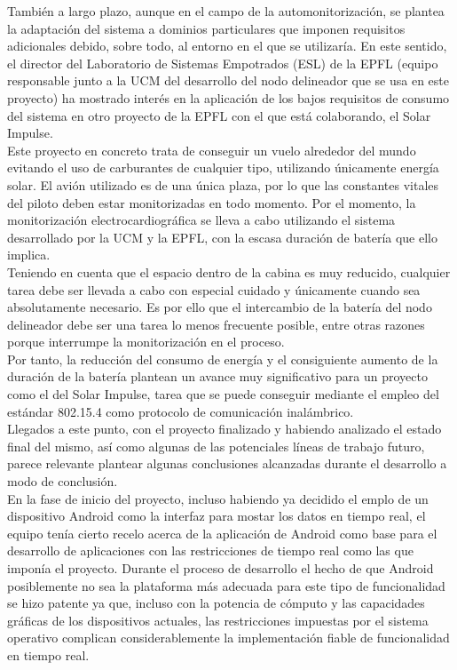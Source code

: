 	También a largo plazo, aunque en el campo de la automonitorización, se plantea la adaptación del
	sistema a dominios particulares que imponen requisitos adicionales debido, sobre todo, al entorno
	en el que se utilizaría. En este sentido, el director del Laboratorio de Sistemas Empotrados (ESL)
	de la EPFL (equipo responsable junto a la UCM del desarrollo del nodo delineador que se usa en
	este proyecto) ha mostrado interés en la aplicación de los bajos requisitos de consumo del sistema
	en otro proyecto de la EPFL con el que está colaborando, el Solar Impulse.\\

	Este proyecto en concreto trata de conseguir un vuelo alrededor del mundo evitando el uso de
	carburantes de cualquier tipo, utilizando únicamente energía solar. El avión utilizado es de una
	única plaza, por lo que las constantes vitales del piloto deben estar monitorizadas en todo
	momento. Por el momento, la monitorización electrocardiográfica se lleva a cabo utilizando el
	sistema desarrollado por la UCM y la EPFL, con la escasa duración de batería que ello implica.\\

	Teniendo en cuenta que el espacio dentro de la cabina es muy reducido, cualquier tarea debe ser
	llevada a cabo con especial cuidado y únicamente cuando sea absolutamente necesario. Es por ello
	que el intercambio de la batería del nodo delineador debe ser una tarea lo menos frecuente posible,
	entre otras razones porque interrumpe la monitorización en el proceso.\\

	Por tanto, la reducción del consumo de energía y el consiguiente aumento de la duración de la
	batería plantean un avance muy significativo para un proyecto como el del Solar Impulse, tarea
	que se puede conseguir mediante el empleo del estándar 802.15.4 como protocolo de comunicación
	inalámbrico.\\

	Llegados a este punto, con el proyecto finalizado y habiendo analizado el estado final del mismo, así como algunas de las potenciales líneas de trabajo futuro, parece relevante plantear algunas conclusiones alcanzadas durante el desarrollo a modo de conclusión.\\

	En la fase de inicio del proyecto, incluso habiendo ya decidido el emplo de un dispositivo Android como la interfaz para mostar los datos en tiempo real, el equipo tenía cierto recelo acerca de la aplicación de Android como base para el desarrollo de aplicaciones con las restricciones de tiempo real como las que imponía el proyecto. Durante el proceso de desarrollo el hecho de que Android posiblemente no sea la plataforma más adecuada para este tipo de funcionalidad se hizo patente ya que, incluso con la potencia de cómputo y las capacidades gráficas de los dispositivos actuales, las restricciones impuestas por el sistema operativo complican considerablemente la implementación fiable de funcionalidad en tiempo real.\\


